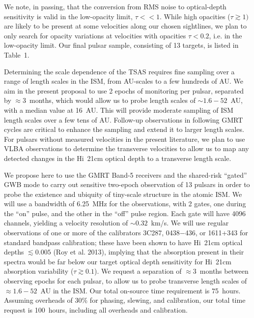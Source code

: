 \documentclass[11pt]{article}
\newcommand{\hi}{H{\sc i}}
\begin{document}
We note, in passing, that the conversion from RMS noise to optical-depth sensitivity is valid in the low-opacity limit, $\tau << 1$. While high opacities ($\tau \gtrsim 1)$ are likely to be present at some velocities along our chosen sightlines, we plan to only search for opacity variations at velocities with opacities $\tau < 0.2$, i.e. in the low-opacity limit. Our final pulsar sample, consisting of 13 targets, is listed in Table~1.

Determining the scale dependence of the TSAS requires fine sampling over a range of length scales in the ISM, from AU-scales to a few hundreds of AU. We aim in the present proposal to use 2 epochs of monitoring per pulsar, separated by $\approx 3$~months, which would allow us to probe length scales of $\sim 1.6 - 52$~AU, with a median value at 16~AU. This will provide moderate sampling of ISM length scales over a few tens of AU. Follow-up observations in following GMRT cycles are critical to enhance the sampling and extend it to larger length scales. For pulsars without measured velocities in the present literature, we plan to use VLBA observations to determine the transverse velocities to allow us to map any detected changes in the \hi~21cm optical depth to a transverse length scale.



\vskip 0.15in
\vskip 0.1in 

We propose here to use the GMRT Band-5 receivers and the shared-risk ``gated'' GWB mode to carry out sensitive two-epoch observation of 13 pulsars in order to probe the existence and ubiquity of tiny-scale structure in the atomic ISM. We will use a bandwidth of 6.25~MHz for the observations, with 2 gates, one during the ``on'' pulse, and the other in the ``off'' pulse region. Each gate will have 4096 channels, yielding a velocity resolution of $\sim 0.32$~km/s. We will use regular observations of one or more of the calibrators 3C287, 0438$-$436, or 1611+343 for standard bandpass calibration; these have been shown to have \hi~21cm optical depths $\lesssim 0.005$ (Roy et al. 2013), implying that the absorption present in their spectra would be far below our target optical depth sensitivity for \hi~21cm absorption variability ($\tau \gtrsim 0.1$). We request a separation of $\approx 3$~months between observing epochs for each pulsar, to allow us to probe transverse length scales of $\approx 1.6-52$~AU in the ISM. Our total on-source time requirement is 75~hours. Assuming overheads of 30\% for phasing, slewing, and calibration, our total time request is 100~hours, including all overheads and calibration.
\end{document}
